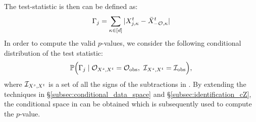 The test-statistic is then can be defined as:
%
\begin{align} \label{eq:test_statistic_mul}
	\Gamma_j = \sum_{\kappa \in [d]}
	|X^t_{j, \kappa} - \bar{X}^t_{- {\mathcal O}, \kappa}| 
\end{align}
%
In order to compute the valid $p$-values, %
we consider the following conditional distribution of the test statistic:
%
\begin{align} \label{eq:conditional_distribution_mul}
	\mathbb{P} \Big ( 
	\Gamma_j
	\mid
	{\mathcal O}_{X^s, X^t}
	=
	{\mathcal O}_{\rm obs}, ~
	{\mathcal I}_{X^s, X^t} 
	=
	{\mathcal I}_{\rm obs}
	\Big ),
\end{align}
%
where ${\mathcal I}_{X^s, X^t}$ is a set of all the signs of the subtractions in .
%
By extending the techniques in \S \ref{subsec:conditional_data_space} and \S \ref{subsec:identification_cZ}, %
the conditional space in  can be obtained which is subsequently used to compute the $p$-value.




















